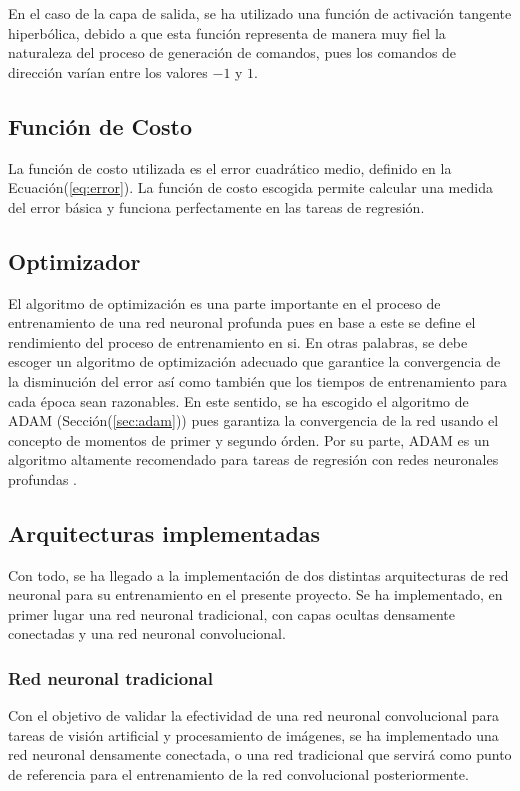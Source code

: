     En el caso de la capa de salida, se ha utilizado una función de activación tangente hiperbólica, debido a que esta función 
    representa de manera muy fiel la naturaleza del proceso de generación de comandos, pues los comandos de dirección varían 
    entre los valores $-1$ y $1$.

    \subsection{Función de Costo}
    La función de costo utilizada es el error cuadrático medio, definido en la Ecuación(\ref{eq:error}). La función de costo 
    escogida permite calcular una medida del error básica y funciona perfectamente en las tareas de regresión.

    \subsection{Optimizador}
    El algoritmo de optimización es una parte importante en el proceso de entrenamiento de una red neuronal profunda pues 
    en base a este se define el rendimiento del proceso de entrenamiento en si. En otras palabras, se debe escoger un 
    algoritmo de optimización adecuado que garantice la convergencia de la disminución del error así como también que los 
    tiempos de entrenamiento para cada época sean razonables. En este sentido, se ha escogido el algoritmo de ADAM (Sección(\ref{sec:adam}))
    pues garantiza la convergencia de la red usando el concepto de momentos de primer y segundo órden. Por su parte, ADAM 
    es un algoritmo altamente recomendado para tareas de regresión con redes neuronales profundas \cite{kingma2014adam}.

    \subsection{Arquitecturas implementadas}
    Con todo, se ha llegado a la implementación de dos distintas arquitecturas de red neuronal para su 
    entrenamiento en el presente proyecto. Se ha implementado, en primer lugar una red neuronal tradicional, con 
    capas ocultas densamente conectadas y una red neuronal convolucional. 

        \subsubsection{Red neuronal tradicional}
        Con el objetivo de validar la efectividad de una red neuronal convolucional para tareas de visión artificial 
        y procesamiento de imágenes, se ha implementado una red neuronal densamente conectada, o una red tradicional 
        que servirá como punto de referencia para el entrenamiento de la red convolucional posteriormente. 

